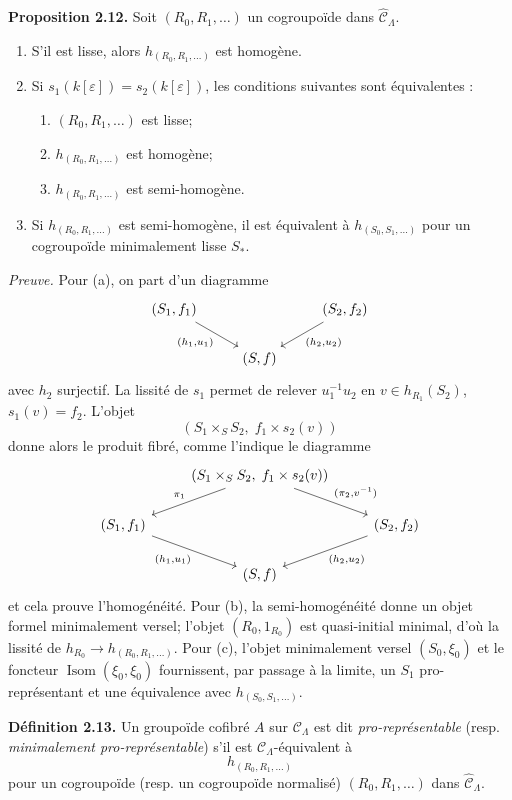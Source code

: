 \documentclass[11pt]{article}
\providecommand{\Isom}{\operatorname{Isom}}
\providecommand{\Isom}{\operatorname{Isom}}
\begin{document}
\textbf{Proposition 2.12.} Soit \((R_0,R_1,\ldots)\) un cogroupo\"ide dans
\(\widehat{\mathcal C}_\Lambda\).
\begin{enumerate}[label=(\alph*)]
\item S'il est lisse, alors \(h_{(R_0,R_1,\ldots)}\) est homog\`ene.
\item Si \(s_1(k[\varepsilon])=s_2(k[\varepsilon])\), les conditions suivantes sont \'equivalentes :
\begin{enumerate}[label=(\roman*)]
\item \((R_0,R_1,\ldots)\) est lisse;
\item \(h_{(R_0,R_1,\ldots)}\) est homog\`ene;
\item \(h_{(R_0,R_1,\ldots)}\) est semi-homog\`ene.
\end{enumerate}
\item Si \(h_{(R_0,R_1,\ldots)}\) est semi-homog\`ene, il est \'equivalent \`a
\(h_{(S_0,S_1,\ldots)}\) pour un cogroupo\"ide minimalement lisse \(S_\ast\).
\end{enumerate}

\emph{Preuve.} Pour (a), on part d'un diagramme
\[
\begin{tikzcd}
(S_1,f_1) \arrow[dr,"{(h_1,u_1)}"'] && (S_2,f_2) \arrow[dl,"{(h_2,u_2)}"]\\
& (S,f) &
\end{tikzcd}
\]
avec \(h_2\) surjectif. La lissit\'e de \(s_1\) permet de relever \(u_1^{-1}u_2\) en
\(v\in h_{R_1}(S_2)\), \(s_1(v)=f_2\). L'objet
\[
 (S_1\times_S S_2,\;f_1\times s_2(v))
\]
donne alors le produit fibr\'e, comme l'indique le diagramme
\[
\begin{tikzcd}
& (S_1\times_S S_2,\; f_1\times s_2(v))
   \arrow[dl,"\pi_1"'] \arrow[dr,"{(\pi_2,v^{-1})}"] &\\
(S_1,f_1)\arrow[dr,"{(h_1,u_1)}"'] &&
(S_2,f_2)\arrow[dl,"{(h_2,u_2)}"]\\
& (S,f) &
\end{tikzcd}
\]
et cela prouve l'homog\'en\'eit\'e. Pour (b), la semi-homog\'en\'eit\'e donne un objet formel
minimalement versel; l'objet \((R_0,1_{R_0})\) est quasi-initial minimal, d'o\`u la lissit\'e
de \(h_{R_0}\to h_{(R_0,R_1,\ldots)}\). Pour (c), l'objet minimalement versel
\((S_0,\xi_0)\) et le foncteur \(\Isom(\xi_0,\xi_0)\) fournissent, par passage \`a la limite,
un \(S_1\) pro-repr\'esentant et une \'equivalence avec \(h_{(S_0,S_1,\ldots)}\).

\textbf{D\'efinition 2.13.} Un groupo\"ide cofibr\'e \(A\) sur \(\mathcal C_\Lambda\) est
dit \emph{pro-repr\'esentable} (resp. \emph{minimalement pro-repr\'esentable}) s'il est
\(\mathcal C_\Lambda\)-\'equivalent \`a
\[
 h_{(R_0,R_1,\ldots)}
\]
pour un cogroupo\"ide (resp. un cogroupo\"ide normalis\'e)
\((R_0,R_1,\ldots)\) dans \(\widehat{\mathcal C}_\Lambda\).
\end{document}

